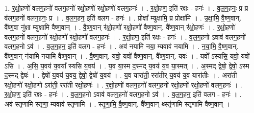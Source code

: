 \documentclass[17pt]{extarticle}
\begin{document}
1. र॒क्षो॒हणो॑ वलग॒हनो॑ वलग॒हनो॑ रक्षो॒हणो॑ रक्षो॒हणो॑ वलग॒हनः॑ । . र॒क्षो॒हण॒ इति॑ रक्षः - हनः॑ । . व॒ल॒ग॒हनः॒ प्र प्र व॑लग॒हनो॑ वलग॒हनः॒ प्र । . व॒ल॒ग॒हन॒ इति॑ वलग - हनः॑ । . प्रोक्षा᳚ म्युक्षामि॒ प्र प्रोक्षा॑मि । . उ॒क्षा॒मि॒ वै॒ष्ण॒वान्. वै᳚ष्ण॒वा नु॑क्षा म्युक्षामि वैष्ण॒वान् । . वै॒ष्ण॒वान् र॑क्षो॒हणो॑ रक्षो॒हणो॑ वैष्ण॒वान्. वै᳚ष्ण॒वान् र॑क्षो॒हणः॑ । . र॒क्षो॒हणो॑ वलग॒हनो॑ वलग॒हनो॑ रक्षो॒हणो॑ रक्षो॒हणो॑ वलग॒हनः॑ । . र॒क्षो॒हण॒ इति॑ रक्षः - हनः॑ । . व॒ल॒ग॒हनो ऽवाव॑ वलग॒हनो॑ वलग॒हनो ऽव॑ । . व॒ल॒ग॒हन॒ इति॑ वलग - हनः॑ । . अव॑ नयामि नया॒ म्यवाव॑ नयामि । . न॒या॒मि॒ वै॒ष्ण॒वान्. वै᳚ष्ण॒वान् न॑यामि नयामि वैष्ण॒वान् । . वै॒ष्ण॒वान्. यवो॒ यवो॑ वैष्ण॒वान्. वै᳚ष्ण॒वान्. यवः॑ । . यवो᳚ ऽस्यसि॒ यवो॒ यवो॑ ऽसि । . अ॒सि॒ य॒वय॑ य॒वया᳚ स्यसि य॒वय॑ । . य॒व या॒स्म द॒स्मद् य॒वय॑ य॒व या॒स्मत् । . अ॒स्मद् द्वेषो॒ द्वेषो॒ ऽस्म द॒स्मद् द्वेषः॑ । . द्वेषो॑ य॒वय॑ य॒वय॒ द्वेषो॒ द्वेषो॑ य॒वय॑ । . य॒व यारा॑ती॒ ररा॑तीर् य॒वय॑ य॒व यारा॑तीः । . अरा॑ती रक्षो॒हणो॑ रक्षो॒हणो ऽरा॑ती॒ ररा॑ती रक्षो॒हणः॑ । . र॒क्षो॒हणो॑ वलग॒हनो॑ वलग॒हनो॑ रक्षो॒हणो॑ रक्षो॒हणो॑ वलग॒हनः॑ । . र॒क्षो॒हण॒ इति॑ रक्षः - हनः॑ । . व॒ल॒ग॒हनो ऽवाव॑ वलग॒हनो॑ वलग॒हनो ऽव॑ । . व॒ल॒ग॒हन॒ इति॑ वलग - हनः॑ । . अव॑ स्तृणामि स्तृणा॒ म्यवाव॑ स्तृणामि । . स्तृ॒णा॒मि॒ वै॒ष्ण॒वान्. वै᳚ष्ण॒वान् थ्स्तृ॑णामि स्तृणामि वैष्ण॒वान् । \newline
\end{document}
